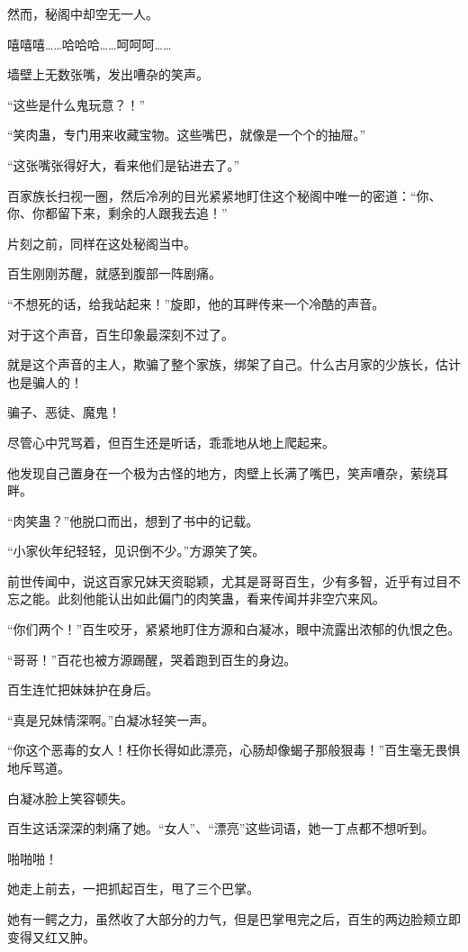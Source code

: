 \begin{this_body}
然而，秘阁中却空无一人。

嘻嘻嘻……哈哈哈……呵呵呵……

墙壁上无数张嘴，发出嘈杂的笑声。

“这些是什么鬼玩意？！”

“笑肉蛊，专门用来收藏宝物。这些嘴巴，就像是一个个的抽屉。”

“这张嘴张得好大，看来他们是钻进去了。”

百家族长扫视一圈，然后冷冽的目光紧紧地盯住这个秘阁中唯一的密道：“你、你、你都留下来，剩余的人跟我去追！”

片刻之前，同样在这处秘阁当中。

百生刚刚苏醒，就感到腹部一阵剧痛。

“不想死的话，给我站起来！”旋即，他的耳畔传来一个冷酷的声音。

对于这个声音，百生印象最深刻不过了。

就是这个声音的主人，欺骗了整个家族，绑架了自己。什么古月家的少族长，估计也是骗人的！

骗子、恶徒、魔鬼！

尽管心中咒骂着，但百生还是听话，乖乖地从地上爬起来。

他发现自己置身在一个极为古怪的地方，肉壁上长满了嘴巴，笑声嘈杂，萦绕耳畔。

“肉笑蛊？”他脱口而出，想到了书中的记载。

“小家伙年纪轻轻，见识倒不少。”方源笑了笑。

前世传闻中，说这百家兄妹天资聪颖，尤其是哥哥百生，少有多智，近乎有过目不忘之能。此刻他能认出如此偏门的肉笑蛊，看来传闻并非空穴来风。

“你们两个！”百生咬牙，紧紧地盯住方源和白凝冰，眼中流露出浓郁的仇恨之色。

“哥哥！”百花也被方源踢醒，哭着跑到百生的身边。

百生连忙把妹妹护在身后。

“真是兄妹情深啊。”白凝冰轻笑一声。

“你这个恶毒的女人！枉你长得如此漂亮，心肠却像蝎子那般狠毒！”百生毫无畏惧地斥骂道。

白凝冰脸上笑容顿失。

百生这话深深的刺痛了她。“女人”、“漂亮”这些词语，她一丁点都不想听到。

啪啪啪！

她走上前去，一把抓起百生，甩了三个巴掌。

她有一鳄之力，虽然收了大部分的力气，但是巴掌甩完之后，百生的两边脸颊立即变得又红又肿。


\end{this_body}
